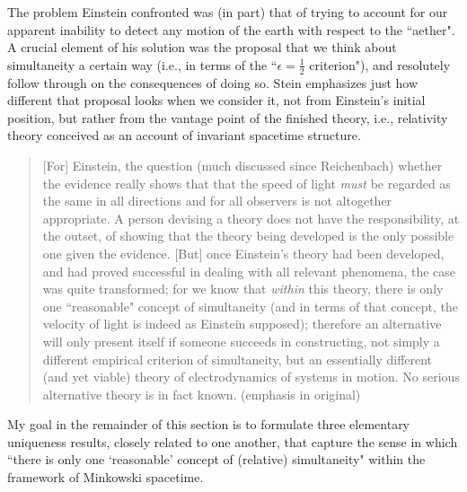 \documentclass [12] {article}
\theoremstyle{plain}
\numberwithin{figure}{subsection}
\numberwithin{proposition}{subsection}
\begin{document}
The problem Einstein confronted was (in part) that of trying to account for our apparent inability to detect any motion of the earth with respect to the ``aether". A crucial element of his solution was the proposal that we think about simultaneity a certain way (i.e., in terms of  the ``$\epsilon = \frac{1}{2}$ criterion"),   and resolutely follow through on the consequences of doing so. Stein emphasizes  just how different that proposal looks when we consider it, not from Einstein's initial position, but rather from the vantage point of the finished theory, i.e., relativity theory conceived as an account of invariant spacetime structure. 
\begin{quote}
\begin{sloppypar} 
[For] Einstein, the question (much discussed since Reichenbach)  whether the evidence really shows that that the speed of light \emph{must} be regarded as the same in all directions and for all observers is not altogether appropriate. A person devising a theory does not have the responsibility, at the outset, of showing that the theory being developed is the only possible one given the evidence. [But] once Einstein's theory had been developed, and had proved successful in dealing with all relevant phenomena, the case was quite transformed; for we know that \emph{within} this theory, there is only one ``reasonable" concept of simultaneity (and in terms of that concept, the velocity of light is indeed as Einstein supposed); therefore an alternative will only present itself if someone succeeds in constructing, not simply a different empirical criterion of simultaneity, but an essentially different (and yet viable) theory of electrodynamics of systems in motion. No serious alternative theory is in fact known.  (emphasis in original)
\end{sloppypar} 
\end{quote}  

My goal in the remainder of this  section is to formulate three elementary uniqueness results, closely related to one another, that capture the sense in which ``there is only one `reasonable' concept of (relative) simultaneity" within the framework of Minkowski spacetime.  
\end{document}
